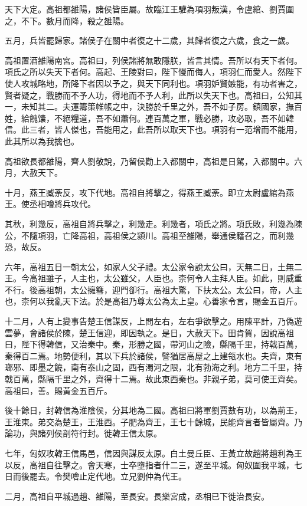 天下大定。高祖都雒陽，諸侯皆臣屬。故臨江王驩為項羽叛漢，令盧綰、劉賈圍之，不下。數月而降，殺之雒陽。

五月，兵皆罷歸家。諸侯子在關中者復之十二歲，其歸者復之六歲，食之一歲。

高祖置酒雒陽南宮。高祖曰，列侯諸將無敢隱朕，皆言其情。吾所以有天下者何。項氏之所以失天下者何。高起、王陵對曰，陛下慢而侮人，項羽仁而愛人。然陛下使人攻城略地，所降下者因以予之，與天下同利也。項羽妒賢嫉能，有功者害之，賢者疑之，戰勝而不予人功，得地而不予人利，此所以失天下也。高祖曰，公知其一，未知其二。夫運籌策帷帳之中，決勝於千里之外，吾不如子房。鎮國家，撫百姓，給餽馕，不絕糧道，吾不如蕭何。連百萬之軍，戰必勝，攻必取，吾不如韓信。此三者，皆人傑也，吾能用之，此吾所以取天下也。項羽有一范增而不能用，此其所以為我擒也。

高祖欲長都雒陽，齊人劉敬說，乃留侯勸上入都關中，高祖是日駕，入都關中。六月，大赦天下。

十月，燕王臧荼反，攻下代地。高祖自將擊之，得燕王臧荼。即立太尉盧綰為燕王。使丞相噲將兵攻代。

其秋，利幾反，高祖自將兵擊之，利幾走。利幾者，項氏之將。項氏敗，利幾為陳公，不隨項羽，亡降高祖，高祖侯之潁川。高祖至雒陽，舉通侯籍召之，而利幾恐，故反。

六年，高祖五日一朝太公，如家人父子禮。太公家令說太公曰，天無二日，土無二王。今高祖雖子，人主也，太公雖父，人臣也。柰何令人主拜人臣。如此，則威重不行。後高祖朝，太公擁篲，迎門卻行。高祖大驚，下扶太公。太公曰，帝，人主也，柰何以我亂天下法。於是高祖乃尊太公為太上皇。心善家令言，賜金五百斤。

十二月，人有上變事告楚王信謀反，上問左右，左右爭欲擊之。用陳平計，乃偽遊雲夢，會諸侯於陳，楚王信迎，即因執之。是日，大赦天下。田肯賀，因說高祖曰，陛下得韓信，又治秦中。秦，形勝之國，帶河山之險，縣隔千里，持戟百萬，秦得百二焉。地勢便利，其以下兵於諸侯，譬猶居高屋之上建瓴水也。夫齊，東有瑯邪、即墨之饒，南有泰山之固，西有濁河之限，北有勃海之利。地方二千里，持戟百萬，縣隔千里之外，齊得十二焉。故此東西秦也。非親子弟，莫可使王齊矣。高祖曰，善。賜黃金五百斤。

後十餘日，封韓信為淮陰侯，分其地為二國。高祖曰將軍劉賈數有功，以為荊王，王淮東。弟交為楚王，王淮西。子肥為齊王，王七十餘城，民能齊言者皆屬齊。乃論功，與諸列侯剖符行封。徙韓王信太原。

七年，匈奴攻韓王信馬邑，信因與謀反太原。白土曼丘臣、王黃立故趙將趙利為王以反，高祖自往擊之。會天寒，士卒墮指者什二三，遂至平城。匈奴圍我平城，七日而後罷去。令樊噲止定代地。立兄劉仲為代王。

二月，高祖自平城過趙、雒陽，至長安。長樂宮成，丞相已下徙治長安。

